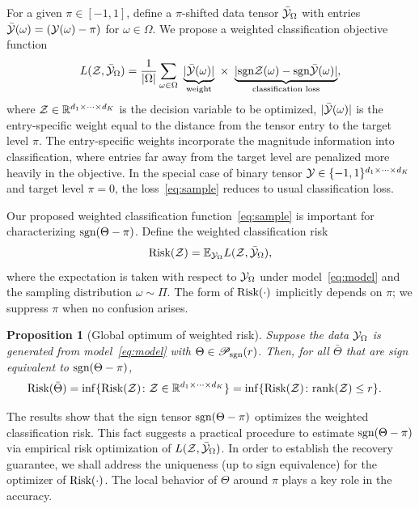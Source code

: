 \documentclass{article}
\theoremstyle{plain}
\newtheorem{prop}{Proposition}
\theoremstyle{definition}
\newcommand*{\KeepStyleUnderBrace}[1]{%
  \mathop{%
    \mathchoice
    {\underbrace{\displaystyle#1}}%
    {\underbrace{\textstyle#1}}%
    {\underbrace{\scriptstyle#1}}%
    {\underbrace{\scriptscriptstyle#1}}%
  }\limits
}
\def\sign{\textup{sgn}}
\def\caliP{\mathscr{P}_{\textup{sgn}}}
\def\risk{\textup{Risk}}
\begin{document}
For a given $\pi \in [-1,1]$, define a $\pi$-shifted data tensor $\bar {\mathcal{Y}}_\Omega$ with entries $\bar {\mathcal{Y}}(\omega) = (\mathcal{Y}(\omega)-\pi)$ for $\omega\in \Omega$. We propose a weighted classification objective function
\begin{equation}\label{eq:sample}
L(\tZ, \bar \tY_\Omega)= {1\over |\Omega|}\sum_{\omega \in \Omega}\ \KeepStyleUnderBrace{|\bar \tY(\omega)|}_{\text{weight}}\  \times \ \KeepStyleUnderBrace{| \sign \tZ(\omega)-\sign \bar \tY(\omega)|}_{\text{classification loss}},
\end{equation}
where $\mathcal{Z}\in\mathbb{R}^{d_1\times \cdots \times d_K}$ is the decision variable to be optimized, $|\bar {\mathcal{Y}}(\omega)|$ is the entry-specific weight equal to the distance from the tensor entry to the target level $\pi$. The entry-specific weights incorporate the magnitude information into classification, where entries far away from the target level are penalized more heavily in the objective. In the special case of binary tensor $\mathcal{Y}\in\{-1,1\}^{d_1\times\cdots\times d_K}$ and target level $\pi=0$, the loss~\eqref{eq:sample} reduces to usual classification loss. 

Our proposed weighted classification function~\eqref{eq:sample} is important for characterizing $\sign(\Theta-\pi)$. Define the weighted classification risk 
\begin{equation}\label{eq:population}
\textup{Risk}(\mathcal{Z})=\mathbb{E}_{\mathcal{Y}_\Omega}L(\mathcal{Z},\bar{\mathcal{Y}}_\Omega),
\end{equation}
where the expectation is taken with respect to $\mathcal{Y}_\Omega$ under model~\eqref{eq:model} and the sampling distribution $\omega\sim\Pi$. %
The form of $\textup{Risk}(\cdot)$ implicitly depends on $\pi$; we suppress $\pi$ when no confusion arises. 

\vspace{.05cm}
\begin{prop}[Global optimum of weighted risk]\label{prop:global}
Suppose the data $\mathcal{Y}_\Omega$ is generated from model~\eqref{eq:model} with $\Theta \in \caliP(r)$. Then, for all $\bar \Theta$ that are sign equivalent to $\sign(\Theta-\pi)$, 
\begin{align}\label{eq:optimal}
\textup{Risk}(\bar \Theta )&=\inf\{\textup{Risk}(\mathcal{Z})\colon \mathcal{Z}\in\mathbb{R}^{d_1\times \cdots \times d_K}\}
=\inf\{\textup{Risk}(\mathcal{Z})\colon \textup{rank} (\mathcal{Z})\leq r\}.
\end{align}
\end{prop}
The results show that the sign tensor $\sign(\Theta-\pi)$ optimizes the weighted classification risk. This fact suggests a practical procedure to estimate $\sign(\Theta-\pi)$ via empirical risk optimization of $L(\mathcal{Z},\bar {\mathcal{Y}}_\Omega)$. In order to establish the recovery guarantee, we shall address the uniqueness (up to sign equivalence) for the optimizer of $\risk(\cdot)$. The local behavior of $\Theta$ around $\pi$ plays a key role in the accuracy. 
\end{document}
